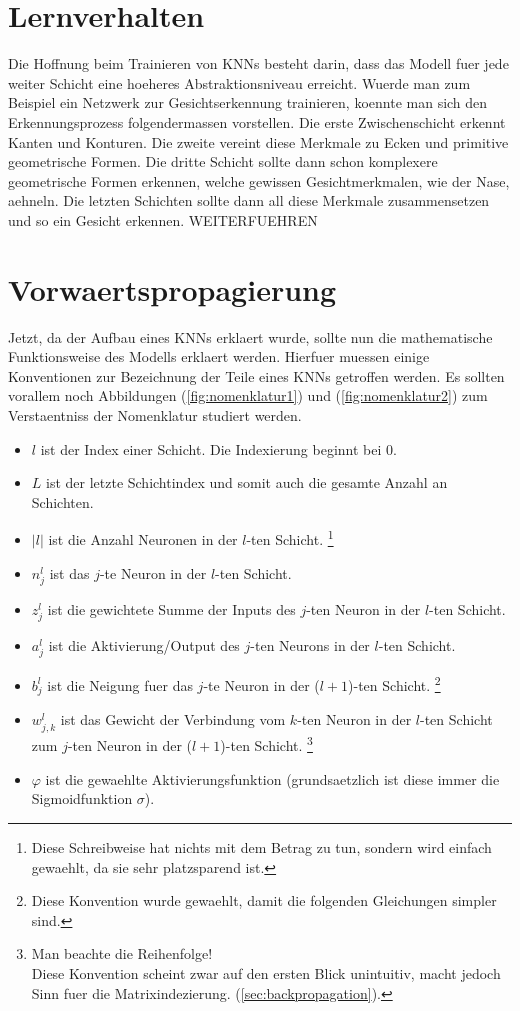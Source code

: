 \section{Lernverhalten}
Die Hoffnung beim Trainieren von KNNs besteht darin, dass das Modell fuer jede
weiter Schicht eine hoeheres Abstraktionsniveau erreicht. Wuerde man zum
Beispiel ein Netzwerk zur Gesichtserkennung trainieren, koennte man sich den
Erkennungsprozess folgendermassen vorstellen. Die erste Zwischenschicht erkennt
Kanten und Konturen. Die zweite vereint diese Merkmale zu Ecken und primitive
geometrische Formen. Die dritte Schicht sollte dann schon komplexere
geometrische Formen erkennen, welche gewissen Gesichtmerkmalen, wie der Nase, aehneln. Die letzten Schichten sollte dann all diese
Merkmale zusammensetzen und so ein Gesicht erkennen.
WEITERFUEHREN

\section{Vorwaertspropagierung}
Jetzt, da der Aufbau eines KNNs erklaert wurde, sollte nun die mathematische Funktionsweise
des Modells erklaert werden. Hierfuer muessen einige Konventionen zur
Bezeichnung der Teile eines KNNs getroffen werden. Es sollten vorallem noch
Abbildungen (\ref{fig:nomenklatur1}) und (\ref{fig:nomenklatur2}) zum Verstaentniss der Nomenklatur studiert werden.
\begin{itemize}
\item{$l$ ist der Index einer Schicht. Die Indexierung beginnt bei 0.}
\item{$L$ ist der letzte Schichtindex und somit auch die gesamte Anzahl an Schichten.}
\item{$|l|$ ist die Anzahl Neuronen in der $l$-ten Schicht.
    \footnote{
      Diese Schreibweise hat nichts mit dem Betrag zu tun, sondern wird einfach
      gewaehlt, da sie sehr platzsparend ist.
    }
  }
\item{$n_j^l$ ist das $j$-te Neuron in der $l$-ten Schicht.}
\item{$z_j^l$ ist die gewichtete Summe der Inputs des $j$-ten Neuron in der $l$-ten Schicht.}
\item{$a_j^l$ ist die Aktivierung/Output des $j$-ten Neurons in der $l$-ten Schicht.}
\item{$b_j^l$ ist die Neigung fuer das $j$-te Neuron in der ($l+1$)-ten Schicht.
    \footnote{
      Diese Konvention wurde gewaehlt, damit die folgenden Gleichungen simpler sind.
    }
  }
\item{$w_{j,k}^l$ ist das Gewicht der Verbindung vom $k$-ten Neuron
    in der $l$-ten Schicht zum $j$-ten Neuron in der ($l+1$)-ten Schicht.
    \footnote{
      Man beachte die Reihenfolge!\\
      Diese Konvention scheint zwar auf den ersten Blick unintuitiv, macht jedoch
      Sinn fuer die Matrixindezierung.
      (\ref{sec:backpropagation}).
    }
  }
\item{$\varphi$ ist die gewaehlte Aktivierungsfunktion (grundsaetzlich ist diese
    immer die Sigmoidfunktion $\sigma$).}
\end{itemize}

